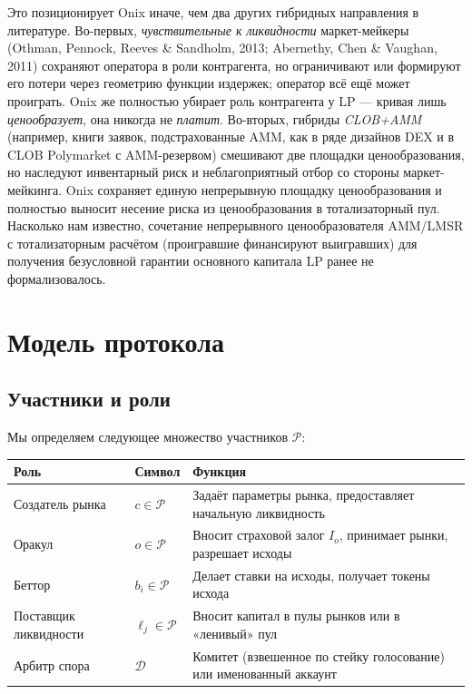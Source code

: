 \documentclass{ledger}
\theoremstyle{plain}
\theoremstyle{remark}
\begin{document}
Это позиционирует Onix иначе, чем два других гибридных направления в литературе.
Во-первых, \emph{чувствительные к ликвидности} маркет-мейкеры (Othman, Pennock,
Reeves \& Sandholm, 2013; Abernethy, Chen \& Vaughan, 2011) сохраняют оператора в
роли контрагента, но ограничивают или формируют его потери через геометрию функции
издержек; оператор всё ещё может проиграть. Onix же полностью убирает роль
контрагента у LP --- кривая лишь \emph{ценообразует}, она никогда не \emph{платит}.
Во-вторых, гибриды \emph{CLOB+AMM} (например, книги заявок, подстрахованные AMM,
как в ряде дизайнов DEX и в CLOB Polymarket с AMM-резервом) смешивают две площадки
ценообразования, но наследуют инвентарный риск и неблагоприятный отбор со стороны
маркет-мейкинга. Onix сохраняет единую непрерывную площадку ценообразования и
полностью выносит несение риска из ценообразования в тотализаторный пул. Насколько
нам известно, сочетание непрерывного ценообразователя AMM/LMSR с тотализаторным
расчётом (проигравшие финансируют выигравших) для получения безусловной гарантии
основного капитала LP ранее не формализовалось.

\section{Модель протокола}\label{sec:model}

\subsection{Участники и роли}

Мы определяем следующее множество участников $\mathcal{P}$:

\begin{center}
\begin{tabular}{lll}
\hline
\textbf{Роль} & \textbf{Символ} & \textbf{Функция} \\
\hline
Создатель рынка & $c \in \mathcal{P}$ & Задаёт параметры рынка, предоставляет начальную ликвидность \\
Оракул & $o \in \mathcal{P}$ & Вносит страховой залог $I_o$, принимает рынки, разрешает исходы \\
Беттор & $b_i \in \mathcal{P}$ & Делает ставки на исходы, получает токены исхода \\
Поставщик ликвидности & $\ell_j \in \mathcal{P}$ & Вносит капитал в пулы рынков или в «ленивый» пул \\
Арбитр спора & $\mathcal{D}$ & Комитет (взвешенное по стейку голосование) или именованный аккаунт \\
\hline
\end{tabular}
\end{center}
\end{document}
